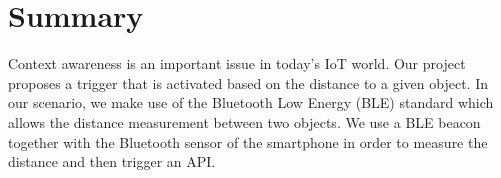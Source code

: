 \documentclass[
10pt, %
a4paper, %
oneside, %
headinclude,footinclude, %
BCOR5mm, %
]{scrartcl}
\title{\spacedallcaps{Distance Based Application Trigger}} %
\author{\small{Mehdi Yosofie, Philipp Schlieker}} %
\date{\today} %
\begin{document}

\renewcommand{\sectionmark}[1]{\markright{\spacedlowsmallcaps{#1}}} %
\lehead{\mbox{\llap{\small\thepage\kern1em\color{halfgray} \vline}\color{halfgray}\hspace{0.5em}\rightmark\hfil}} %

\pagestyle{scrheadings} %


\maketitle %

\setcounter{tocdepth}{2} %

\tableofcontents %




\section*{Summary} %

Context awareness is an important issue in today's IoT world. Our project proposes a trigger that is activated based on the distance to a given object. In our scenario, we make use of the Bluetooth Low Energy (BLE) standard which allows the distance measurement between two objects. We use a BLE beacon together with the Bluetooth sensor of the smartphone in order to measure the distance and then trigger an API.
\end{document}
